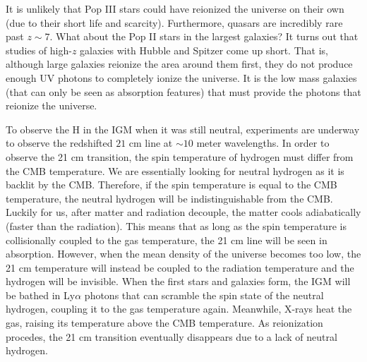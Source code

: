 It is unlikely that Pop III stars could have reionized the universe on their own (due to their
short life and scarcity).  Furthermore, quasars are incredibly rare past $z\sim 7$.  What about
the Pop II stars in the largest galaxies?  It turns out that studies of high-$z$ galaxies
with Hubble and Spitzer come up short.  That is, although large galaxies reionize the area
around them first, they do not produce enough UV photons to completely ionize the universe.
It is the low mass galaxies (that can only be seen as absorption features) that must provide
the photons that reionize the universe.

To observe the H in the IGM when it was still neutral, experiments 
are underway to observe the redshifted $21$ cm line at $\sim 10$ meter wavelengths.
In order to observe the 21 cm transition, the spin temperature of hydrogen must differ
from the CMB temperature.  We are essentially looking for neutral hydrogen as it is backlit
by the CMB.  Therefore, if the spin temperature is equal to the CMB temperature, the neutral
hydrogen will be indistinguishable from the CMB.  Luckily for us, after matter and radiation
decouple, the matter cools adiabatically (faster than the radiation).  This means that
as long as the spin temperature is collisionally coupled to the gas temperature, the 21 cm line
will be seen in absorption.  However, when the mean density of the universe becomes too low,
the 21 cm temperature will instead be coupled to the radiation temperature and the hydrogen
will be invisible.  When the first stars and galaxies form, the IGM will be bathed
in Ly$\alpha$ photons that can scramble the spin state of the neutral hydrogen, coupling it to
the gas temperature again.  Meanwhile, X-rays heat the gas, raising its temperature above the CMB temperature.  As reionization procedes, the 21 cm transition eventually disappears due to a lack of neutral
hydrogen.

